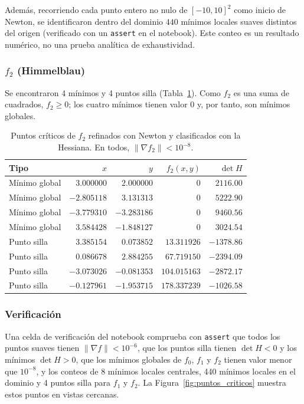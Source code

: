 Además, recorriendo cada punto entero no nulo de $[-10,10]^2$ como inicio
de Newton, se identificaron dentro del dominio $440$ mínimos locales
suaves distintos del origen (verificado con un \texttt{assert} en el
notebook). Este conteo es un resultado numérico, no una prueba analítica de
exhaustividad.

\subsubsection{\texorpdfstring{$f_2$}{f2} (Himmelblau)}
Se encontraron 4 mínimos y 4 puntos silla (Tabla~\ref{tab:criticos_f2}).
Como $f_2$ es una suma de cuadrados, $f_2\geq0$; los cuatro mínimos tienen
valor $0$ y, por tanto, son mínimos globales.

\begin{table}[H]
\centering
\begin{tabular}{lrrrr}
\toprule
Tipo & $x$ & $y$ & $f_2(x,y)$ & $\det H$ \\
\midrule
Mínimo global & $3.000000$  & $2.000000$  & $0$ & $2116.00$ \\
Mínimo global & $-2.805118$ & $3.131313$  & $0$ & $5222.90$ \\
Mínimo global & $-3.779310$ & $-3.283186$ & $0$ & $9460.56$ \\
Mínimo global & $3.584428$  & $-1.848127$ & $0$ & $3024.54$ \\
Punto silla   & $3.385154$  & $0.073852$  & $13.311926$  & $-1378.86$ \\
Punto silla   & $0.086678$  & $2.884255$  & $67.719150$  & $-2394.09$ \\
Punto silla   & $-3.073026$ & $-0.081353$ & $104.015163$ & $-2872.17$ \\
Punto silla   & $-0.127961$ & $-1.953715$ & $178.337239$ & $-1026.58$ \\
\bottomrule
\end{tabular}
\caption{Puntos críticos de $f_2$ refinados con Newton y clasificados con
la Hessiana. En todos, $\lVert\nabla f_2\rVert<10^{-8}$.}
\label{tab:criticos_f2}
\end{table}

\subsubsection{Verificación}
Una celda de verificación del notebook comprueba con \texttt{assert} que
todos los puntos suaves tienen $\lVert\nabla f\rVert<10^{-6}$, que los
puntos silla tienen $\det H<0$ y los mínimos $\det H>0$, que los mínimos
globales de $f_0$, $f_1$ y $f_2$ tienen valor menor que $10^{-8}$, y los
conteos de 8 mínimos locales centrales, 440 mínimos locales en el dominio y
4 puntos silla para $f_1$ y $f_2$. La Figura~\ref{fig:puntos_criticos}
muestra estos puntos en vistas cercanas.

